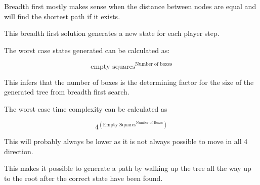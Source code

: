 \documentclass[../../main.tex]{subfiles}
\begin{document}
Breadth first mostly makes sense when the distance between nodes are equal and
will find the shortest path if it exists.

This breadth first solution generates a new state for each player step.

The worst case states generated can be calculated as:

\begin{equation}
	\textrm{empty squares}^{ \textrm{Number of boxes}}
\end{equation}

This infers that the number of boxes is the determining factor for the size
of the generated tree from breadth first search.

The worst case time complexity can be calculated as

\begin{equation}
	4^{  \left(  \textrm{Empty Squares} ^{ \textrm{Number of Boxes}}  \right)   }
\end{equation}

This will probably always be lower as it is not always possible to move in all 4 direction.

This makes it possible to generate a path by walking up the tree all the way up to the root after the correct state have 	been found.




	
\end{document}
